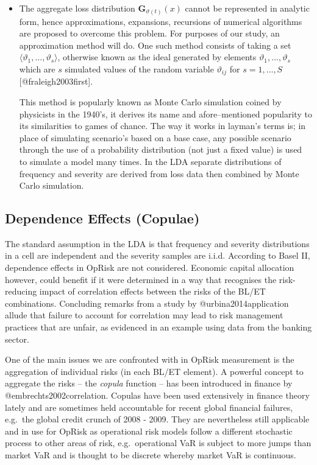 \documentclass[]{article}
\begin{document}
\begin{itemize}
\item The aggregate loss distribution \begin{math} \mathbf {G}_{\vartheta(t)}(x) \end{math} cannot be represented in analytic form, hence approximations, expansions, recursions of numerical algorithms are proposed to overcome this problem.  For purposes of our study, an approximation method will do. One such method consists of taking a set \begin{math} \langle \vartheta_1, \ldots , \vartheta_s \rangle \end{math}, otherwise known as the ideal generated by elements \begin{math} \vartheta_1, \ldots , \vartheta_s \end{math} which are $s$ simulated values of the random variable $\vartheta_{ij}$  for $s = 1,\ldots, S$ [@fraleigh2003first].\medskip

This method is popularly known as Monte Carlo simulation coined by physicists in the 1940's, it derives its name and afore--mentioned popularity to its similarities to games of chance. The way it works in layman's terms is; in place of simulating scenario's based on a base case, any possible scenario through the use of a probability distribution (not just a fixed value) is used to simulate a model many times. In the LDA separate distributions of frequency and severity are derived from loss data then combined by Monte Carlo simulation. 
\end{itemize}

\subsection{Dependence Effects (Copulae)}

The standard assumption in the LDA is that frequency and severity
distributions in a cell are independent and the severity samples are
i.i.d. According to Basel II, dependence effects in OpRisk are not
considered. Economic capital allocation however, could benefit if it
were determined in a way that recognises the risk-reducing impact of
correlation effects between the risks of the BL/ET combinations.
Concluding remarks from a study by @urbina2014application allude that
failure to account for correlation may lead to risk management practices
that are unfair, as evidenced in an example using data from the banking
sector. \medskip

One of the main issues we are confronted with in OpRisk measurement is
the aggregation of individual risks (in each BL/ET element). A powerful
concept to aggregate the risks -- the \emph{copula} function -- has been
introduced in finance by @embrechts2002correlation. Copulas have been
used extensively in finance theory lately and are sometimes held
accountable for recent global financial failures, e.g.~the global credit
crunch of 2008 - 2009. They are nevertheless still applicable and in use
for OpRisk as operational risk models follow a different stochastic
process to other areas of risk, e.g.~operational VaR is subject to more
jumps than market VaR and is thought to be discrete whereby market VaR
is continuous. \medskip
\end{document}
